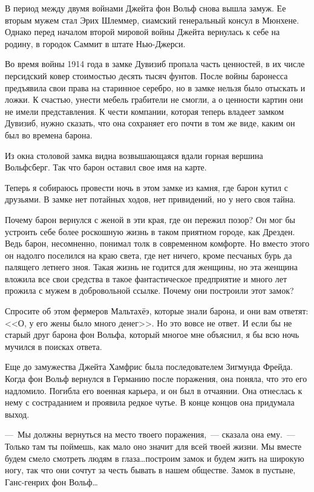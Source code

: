 \documentclass[12pt,a4paper,twoside,openany,svgnames]{memoir}
\begin{document}
В период между двумя войнами Джейта фон Вольф снова вышла замуж. Ее вторым мужем стал Эрих Шлеммер, сиамский генеральный консул в Мюнхене. Однако перед началом второй мировой войны Джейта вернулась к себе на родину, в городок Саммит в штате Нью-Джерси.

Во время войны 1914 года в замке Дувизиб пропала часть ценностей, в их числе персидский ковер стоимостью десять тысяч фунтов. После войны баронесса предъявила свои права на старинное серебро, но в замке нельзя было отыскать и ложки. К счастью, унести мебель грабители не смогли, а о ценности картин они не имели представления. К чести компании, которая теперь владеет замком Дувизиб, нужно сказать, что она сохраняет его почти в том же виде, каким он был во времена барона.

Из окна столовой замка видна возвышающаяся вдали горная вершина Вольфсберг. Так что барон оставил свое имя на карте.

Теперь я собираюсь провести ночь в этом замке из камня, где барон кутил с друзьями. В замке нет потайных ходов, нет привидений, но у него своя тайна.

Почему барон вернулся с женой в эти края, где он пережил позор? Он мог бы устроить себе более роскошную жизнь в таком приятном городе, как Дрезден. Ведь барон, несомненно, понимал толк в современном комфорте. Но вместо этого он надолго поселился на краю света, где нет ничего, кроме песчаных бурь да палящего летнего зноя. Такая жизнь не годится для женщины, но эта женщина вложила все свои средства в такое фантастическое предприятие и много лет прожила с мужем в добровольной ссылке. Почему они построили этот замок?

Спросите об этом фермеров Мальтахёэ, которые знали барона, и они вам ответят: <<О, у его жены было много денег>>. Но это вовсе не ответ. И если бы не старый друг барона фон Вольфа, который многое мне объяснил, я бы всю ночь мучился в поисках ответа.

Еще до замужества Джейта Хамфрис была последователем Зигмунда Фрейда. Когда фон Вольф вернулся в Германию после поражения, она поняла, что это его надломило. Погибла его военная карьера, и он был в отчаянии. Она отнеслась к нему с состраданием и проявила редкое чутье. В конце концов она придумала выход.

---~Мы должны вернуться на место твоего поражения,~--- сказала она ему.~--- Только там ты поймешь, как мало оно значит для всей твоей жизни. Мы вместе будем смело смотреть людям в глаза\ldots построим замок и будем жить на широкую ногу, так что они сочтут за честь бывать в нашем обществе. Замок в пустыне, Ганс-генрих фон Вольф\ldots
\end{document}
